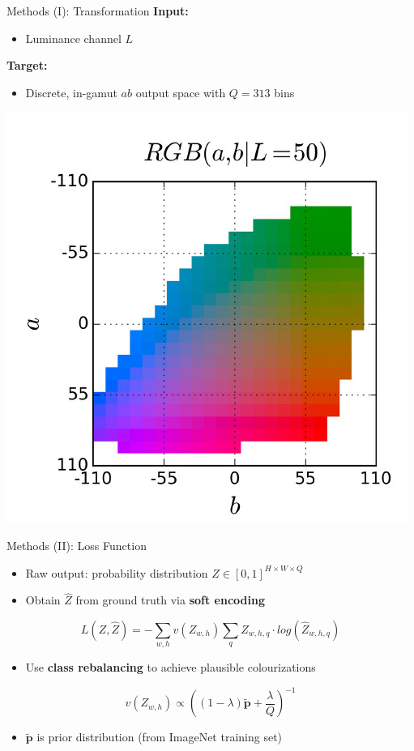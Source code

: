 \documentclass{beamer}
\begin{document}

\begin{frame}{Methods (I): Transformation}
  \textbf{Input:}
    \begin{itemize}
       \item Luminance channel $L$
    \end{itemize}

  \medskip

  \textbf{Target:}
    \begin{itemize}
      \item Discrete, in-gamut $ab$ output space with $Q = 313$ bins
    \end{itemize}

  \medskip

  \begin{center}
    \includegraphics[width=.4\linewidth]{resources/gamut.jpg}
  \end{center}
\end{frame}

\begin{frame}{Methods (II): Loss Function}
  \begin{itemize}
    \item Raw output: probability distribution $Z \in [0, 1]^{H \times W \times Q}$
    \item Obtain $\hat{Z}$ from ground truth via \textbf{soft encoding}
  \end{itemize}

  \begin{equation}
    L(Z, \hat{Z}) = -\sum_{w,h} v(Z_{w,h}) \sum_q Z_{w,h,q} \cdot log(\hat{Z}_{w,h,q})
  \end{equation}

  \begin{itemize}
    \item Use \textbf{class rebalancing} to achieve plausible colourizations
  \end{itemize}

  \begin{equation}
    v(Z_{w,h}) \propto \left((1 - \lambda) \tilde{\bm{p}} + \frac{\lambda}{Q} \right)^{-1}
  \end{equation}

  \begin{itemize}
    \item $\tilde{\bm{p}}$ is prior distribution (from ImageNet training set)
  \end{itemize}
\end{frame}
\end{document}
